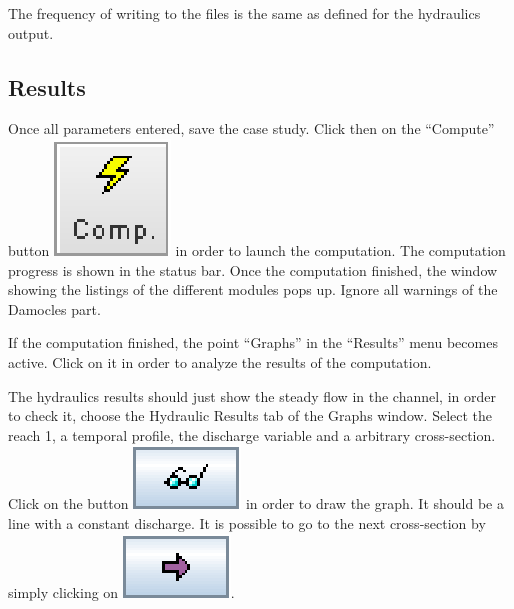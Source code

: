 \documentclass[a4paper,12pt]{article}
\begin{document}
\vspace{0.5cm}

The frequency of writing to the files is the same as defined for the
hydraulics output.


\subsection{Results}

Once all parameters entered, save the case study. Click then on the
{}``Compute'' button \includegraphics[scale=0.6]{compute}
in order to launch the computation. The computation progress is shown
in the status bar. Once the computation finished, the window showing
the listings of the different modules pops up. Ignore all warnings
of the Damocles part. 

\vspace{0.5cm}

If the computation finished, the point {}``Graphs'' in the {}``Results''
menu becomes active. Click on it in order to analyze the results of
the computation. 

\vspace{0.5cm}

The hydraulics results should just show the steady flow in the channel,
in order to check it, choose the Hydraulic Results tab of the Graphs
window. Select the reach 1, a temporal profile, the discharge variable
and a arbitrary cross-section. Click on the button \includegraphics[scale=0.6]{show}
in order to draw the graph. It should be a line with a constant discharge.
It is possible to go to the next cross-section by simply clicking
on \includegraphics[scale=0.6]{avancer}.

\vspace{0.5cm}
\end{document}
